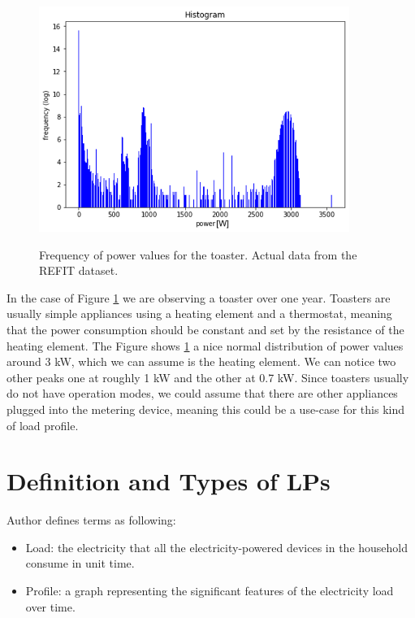 \begin{figure}[H]
	\centering
	\caption{Frequency of power values for the toaster. Actual data from the REFIT dataset.}
	\includegraphics[width=0.9\textwidth]{Figures/profile_sketches/freq.png}
	\label{fig:freq}
\end{figure}

In the case of Figure \ref{fig:freq} we are observing a toaster over one year.
Toasters are usually simple appliances using a heating element and a thermostat, meaning that the power consumption should be constant and set by the resistance of the heating element.
The Figure shows \ref{fig:freq} a nice normal distribution of power values around 3 kW, 
which we can assume is the heating element.
We can notice two other peaks one at roughly 1 kW and the other at 0.7 kW.
Since toasters usually do not have operation modes, we could assume that there 
are other appliances plugged into the metering device, 
meaning this could be a use-case for this kind of load profile.

\section{Definition and Types of LPs}
\label{sec:LP_types}
Author \cite{Review2021} defines terms as following:

\begin{itemize}
	\item Load: the electricity that all the electricity-powered devices in the household consume in unit time.
	\item Profile: a graph representing the significant features of the electricity load over time.
\end{itemize}



